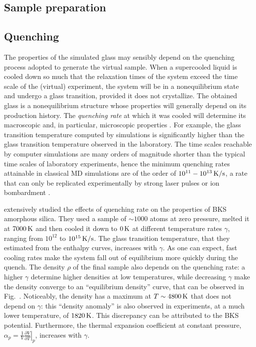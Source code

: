 \subsection{Sample preparation}
\subsection{Quenching}
The properties of the simulated glass may sensibly depend on the quenching process adopted to generate the virtual sample. 
When a supercooled liquid is cooled down so much that the relaxation times of the system exceed the time scale of the (virtual) experiment, the system will be in a nonequilibrium state and undergo a glass transition, provided it does not crystallize. The obtained glass is a nonequilibrium structure whose properties will generally depend on its production history. The \emph{quenching rate} at which it was cooled will determine its macroscopic and, in particular, microscopic properties \cite{Vollmayr1996}. 
For example, the glass transition temperature computed by simulations is significantly higher than the glass transition temperature observed in the laboratory. 
The time scales reachable by computer simulations are many orders of magnitude shorter than the typical time scales of laboratory experiments, hence the minimum quenching rates attainable in classical MD simulations are of the order of $10^{11}-10^{13}\,\mathrm{K/s}$, a rate that can only be replicated experimentally by strong laser pulses or ion bombardment \cite{Soules2011}.

\citet{Vollmayr1996} extensively studied the effects of quenching rate on the properties of BKS amorphous silica. They used a sample of $\sim 1000$ atoms at zero pressure, melted it at $7000\,\mathrm{K}$ and then cooled it down to $0\,\mathrm{K}$ at different temperature rates $\gamma$, ranging from $10^{12}$ to $10^{15}\,\mathrm{K/s}$. The glass transition temperature, that they estimated from the enthalpy curves, increases with $\gamma$. As one can expect, fast cooling rates make the system fall out of equilibrium more quickly during the quench. 
The density $\rho$ of the final sample also depends on the quenching rate: a higher $\gamma$ determine higher densities at low temperatures, while decreasing $\gamma$ make the density converge to an ``equilibrium density'' curve, that can be observed in Fig.~. Noticeably, the density has a maximum at $T\sim 4800\,\mathrm{K}$ that does not depend on $\gamma$: this ``density anomaly'' is also observed in experiments, at a much lower temperature, of $1820\,\mathrm{K}$. This discrepancy can be attributed to the BKS potential.
Furthermore, the thermal expansion coefficient at constant pressure, $\alpha_p = \frac{1}{V} \left.\frac{\partial V}{\partial T}\right|_p$, increases with $\gamma$.

